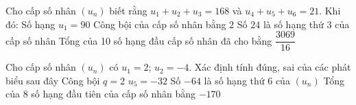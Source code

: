 \begin{ex}%
 Cho cấp  số nhân ${\left(u_n\right)}$ biết rằng ${u_1+u_2+u_3=168}$ và ${u_4+u_5+u_6=21}$. Khi đó:
  \choiceTF
  {Số hạng $u_1=90$} 
  {Công bội của cấp số  nhân bằng $2$}
  {\True Số  $24$ là số hạng thứ 3 của cấp số nhân }
  {\True Tổng của 10 số hạng đầu cấp  số nhân đã cho bằng $\dfrac{3069}{16}$}
\end{ex}

\begin{ex}%
 Cho cấp số nhân $\left(u_n\right)$ có $u_1=2$; $u_2=-4$. Xác định tính  đúng, sai của các phát biểu sau đây
 \choiceTF 
   {Công bội $ q=2$}
  {$u_5=-32$} 
  {\True Số $-64$ là số hạng thứ  $6$ của $\left(u_n\right)$}
  {\True Tổng của $8$ số hạng đầu tiên của cấp số nhân bằng $-170$} 
\end{ex}

